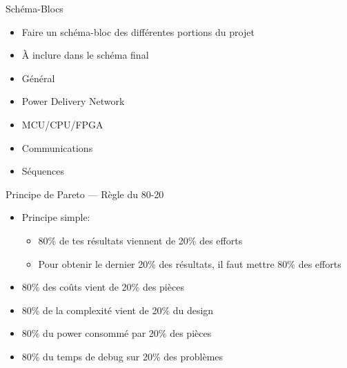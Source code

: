 \begin{frame}{Schéma-Blocs}
    \vspace{-8pt}
    \begin{twocolumns}
        \leftcol
        \begin{itemize}
            \item Faire un schéma-bloc des différentes portions du projet
            \item À inclure dans le schéma final 
        \end{itemize}

        \rightcol
        \begin{itemize}
            \item Général
            \item Power Delivery Network
            \item MCU/CPU/FPGA
            \item Communications
            \item Séquences
        \end{itemize}
    \end{twocolumns}
    \vfill
\end{frame}

\begin{frame}{Principe de Pareto --- Règle du 80-20}
    \begin{itemize}
        \item Principe simple:
        \begin{itemize}
            \item 80\% de tes résultats viennent de 20\% des efforts
            \item Pour obtenir le dernier 20\% des résultats, il faut mettre 80\% des efforts
        \end{itemize}
    \end{itemize}
    \vfill
     {
    }

     {
    \begin{twocolumns}[0.6]
        \leftcol
        \begin{itemize}
            \item 80\% des coûts vient de 20\% des pièces
            \item 80\% de la complexité vient de 20\% du design
            \item 80\% du power consommé par 20\% des pièces
            \item 80\% du temps de debug sur 20\% des problèmes
        \end{itemize}
        \rightcol
    \end{twocolumns}
    }
\end{frame}


